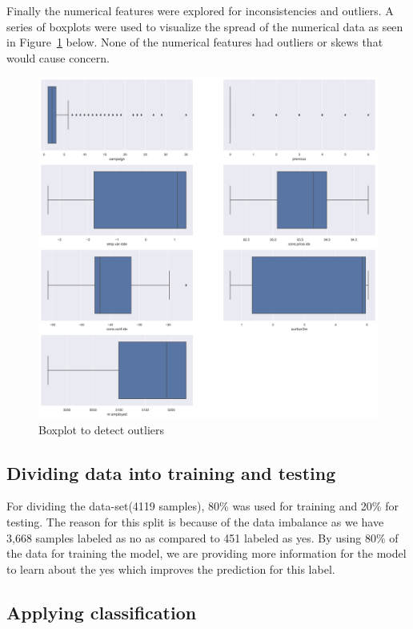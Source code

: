 Finally the numerical features were explored for inconsistencies and outliers. A series of boxplots were used to visualize the spread of the numerical data as seen in Figure~\ref{fig:fig1} below. None of the numerical features had outliers or skews that would cause concern.
\begin{figure}[h!]
  \centering
  \includegraphics[width=6.1in]{assignment2/1-1-boxplots.png}
  \caption{Boxplot to detect outliers}
  \label{fig:fig1}
\end{figure}

\newpage
\subsection{Dividing data into training and testing}
For dividing the data-set(4119 samples), 80\% was used for training and 20\% for testing. The reason for this split is because of the data imbalance as we have  3,668 samples labeled as no as compared to 451 labeled as yes. By using 80\% of the data for training the model, we are providing more information for the model to learn about the yes which improves the prediction for this label. %


\subsection{Applying classification}


